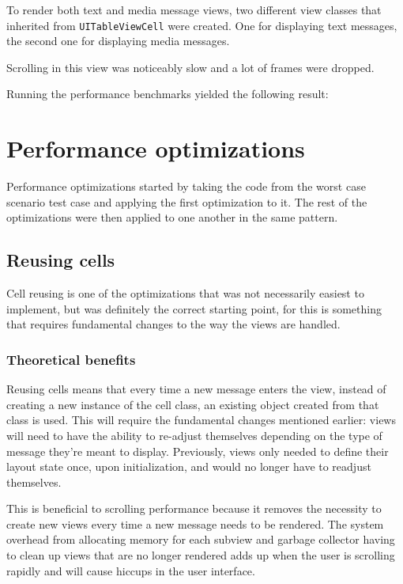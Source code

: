 \documentclass[a4paper,12pt]{article}
\begin{document}
To render both text and media message views, two different view classes that inherited from \texttt{UITableViewCell} were created. One for displaying text messages, the second one for displaying media messages.

Scrolling in this view was noticeably slow and a lot of frames were dropped.

Running the performance benchmarks yielded the following result:

\newpage
\section{Performance optimizations}
Performance optimizations started by taking the code from the worst case scenario test case and applying the first optimization to it. The rest of the optimizations were then applied to one another in the same pattern.

\subsection{Reusing cells}
Cell reusing is one of the optimizations that was not necessarily easiest to implement, but was definitely the correct starting point, for this is something that requires fundamental changes to the way the views are handled.

\subsubsection*{Theoretical benefits}
Reusing cells means that every time a new message enters the view, instead of creating a new instance of the cell class, an existing object created from that class is used. This will require the fundamental changes mentioned earlier: views will need to have the ability to re-adjust themselves depending on the type of message they're meant to display. Previously, views only needed to define their layout state once, upon initialization, and would no longer have to readjust themselves.

This is beneficial to scrolling performance because it removes the necessity to create new views every time a new message needs to be rendered. The system overhead from allocating memory for each subview and garbage collector having to clean up views that are no longer rendered adds up when the user is scrolling rapidly and will cause hiccups in the user interface.
\end{document}
